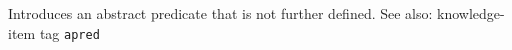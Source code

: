   

Introduces an abstract predicate that is not further defined.
See also: knowledge-item tag {\tt apred}


